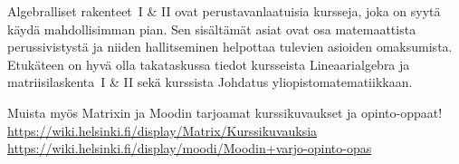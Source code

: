 \documentclass[../ala_hataile.tex]{subfiles}
\begin{document}
	Algebralliset rakenteet~I \& II ovat perustavanlaatuisia
	kursseja, joka on syytä
	käydä mahdollisimman pian. Sen sisältämät
	asiat ovat osa matemaattista perussivistystä
	ja niiden hallitseminen helpottaa
	tulevien asioiden omaksumista. Etukäteen
	on hyvä olla takataskussa tiedot kursseista
	Lineaarialgebra ja matriisilaskenta~I \& II
	sekä kurssista Johdatus yliopistomatematiikkaan.
	
	
	
	\begin{figure*}[!b]
		Muista myös Matrixin ja Moodin tarjoamat kurssikuvaukset ja opinto-oppaat!\\ \url{https://wiki.helsinki.fi/display/Matrix/Kurssikuvauksia}\\
		\url{https://wiki.helsinki.fi/display/moodi/Moodin+varjo-opinto-opas}
	\end{figure*}
\end{document}

